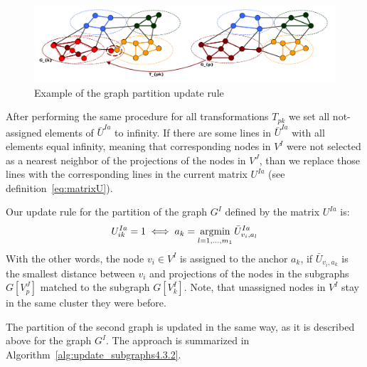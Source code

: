 \begin{figure}[h]
	\centering
	\includegraphics[scale=0.35]{chapter2/fig/update.pdf}
	\caption{Example of the graph partition update rule} \label{fig:update}
\end{figure}

After performing the same procedure for all transformations $T_{pk}$ we set all not-assigned elements of $\bar{U}^{Ia}$ to infinity. If there are some lines in $\bar{U}^{Ia}$ with all elements equal infinity, meaning that corresponding nodes in $V^I$ were not selected as a nearest neighbor of the projections of the nodes in $V^J$,
than we replace those lines with the corresponding lines in the current matrix $U^{Ia}$ (see definition~\eqref{eq:matrixU}).

Our update rule for the partition of the graph $G^I$ defined by the matrix $U^{Ia}$ is:
\begin{equation}
U^{Ia}_{ik}=1 \iff a_k=\mathop{\rm argmin}_{l=1,\dots,m_1}^{}{\bar{U}^{Ia}_{v_i,a_l}}
\end{equation}
With the other words, the node $v_i\in V^I$ is assigned to the anchor $a_k$, if $\bar{U}_{v_i,a_k}$ is the smallest distance between $v_i$ and projections of the nodes in the subgraphs $G[V^J_p]$ matched to the subgraph $G[V^I_k]$. Note, that unassigned nodes in $V^I$ stay in the same cluster they were before.

The partition of the second graph is updated in the same way, as it is described above for the graph $G^I$. The approach is summarized in Algorithm~\ref{alg:update_subgraphs4.3.2}.

